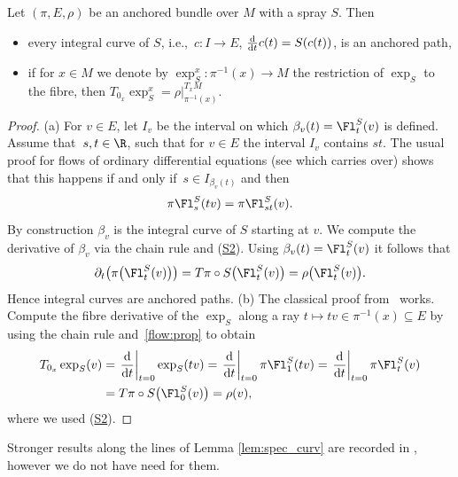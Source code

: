 \begin{Lemma}\label{lem:spec_curv}
Let $(\pi, E,\rho)$ be an anchored bundle over $M$ with a spray $S$. Then
\begin{itemize}\itemsep=0pt
\item[$(a)$] every integral curve of $S$, i.e.,~$c \colon I \rightarrow E$, $\frac{{\rm d}}{{\rm d}t}c(t)=S(c(t))$, is an anchored path,
\item[$(b)$] if for $x \in M$ we denote by $\exp_S^x \colon \pi^{-1}(x)\rightarrow M$ the restriction of $\exp_S$ to the fibre, then $T_{0_x} \exp_S^x = \rho|_{\pi^{-1}(x)}^{T_xM}$.
\end{itemize}
\end{Lemma}

\begin{proof}
(a) For $v \in E$, let $I_v$ be the interval on which $\beta_v (t)= \Fl_{t}^S(v)$ is defined. Assume that~${s,t \in \R}$, such that for $v \in E$ the interval $I_v$ contains $st$.
The usual proof for flows of ordinary differential equations (see \cite[p.~106]{La01} which carries over) shows that this happens if and only if~${s \in I_{\beta_v(t)}}$ and then
\begin{align}
\pi\Fl_{s}^S(tv)= \pi \Fl^S_{st}(v).\label{flow:prop}
\end{align}
By construction $\beta_v$ is the integral curve of $S$ starting at $v$.
We compute the derivative of $\beta_v$ via the chain rule and (\hyperlink{sprayS2}{S2}).
Using {$\beta_v (t)=\Fl^S_t (v)$} it follows that
\begin{displaymath}
 \partial_t \bigl(\pi\bigl(\Fl^S_t (v)\bigr)\bigr) = T\pi \circ S \bigl(\Fl^S_t (v)\bigr) = \rho \bigl(\Fl^S_t (v)\bigr).\end{displaymath}
Hence integral curves are anchored paths.
(b) The classical proof from~\cite{La01} works. Compute the fibre derivative of the $\exp_S$ along a ray $t\mapsto tv \in \pi^{-1}(x) \subseteq E$ by using the chain rule and~\eqref{flow:prop} to obtain
\begin{align*}
T_{0_x}\exp_S (v)&=\left.\frac{{\rm d}}{{\rm d}t}\right|_{t=0} \exp_S (tv)= \left. \frac{{\rm d}}{{\rm d}t}\right|_{t=0} \pi \Fl^{S}_{1}(tv) = \left. \frac{{\rm d}}{{\rm d}t}\right|_{t=0} \pi \Fl^{S}_{t}(v) \\
&=T\pi \circ S\bigl(\Fl_0^S(v)\bigr) =\rho (v),
\end{align*}
where we used (\hyperlink{sprayS2}{S2}).
\end{proof}

Stronger results along the lines of Lemma \ref{lem:spec_curv} are recorded in \cite{ana11}, however we do not have need for them.

